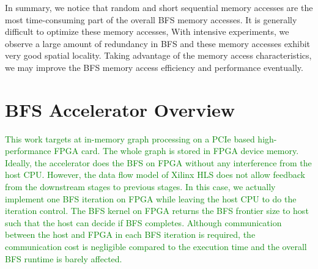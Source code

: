 %

In summary, we notice that random and short sequential memory accesses 
are the most time-consuming part of the overall BFS memory accesses. 
It is generally difficult to optimize these memory accesses, 
With intensive experiments, we observe a large amount of redundancy in BFS and 
these memory accesses exhibit very good spatial locality. Taking advantage of the 
memory access characteristics, we may improve the BFS memory access efficiency 
and performance eventually.

\section{BFS Accelerator Overview} \label{sec:overview}
\textcolor{green}{This work targets at in-memory graph processing on a PCIe based 
high-performance FPGA card. The whole graph is stored in FPGA device
memory. Ideally, the accelerator does the BFS on FPGA without
any interference from the host CPU. However, the data flow model 
of Xilinx HLS does not allow feedback from the downstream stages 
to previous stages. In this case, we actually implement one 
BFS iteration on FPGA while leaving the host CPU to do the iteration 
control. The BFS kernel on FPGA returns the BFS frontier size to host such 
that the host can decide if BFS completes. Although communication 
between the host and FPGA in each BFS iteration is required, the communication cost 
is negligible compared to the execution time and the overall BFS runtime 
is barely affected.}

